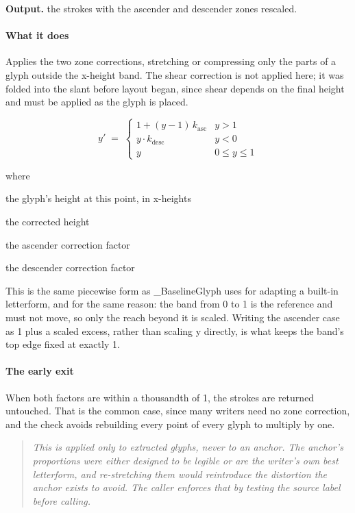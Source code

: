 \noindent\textbf{Output.} the strokes with the ascender and descender zones rescaled.


\paragraph{What it does}
Applies the two zone corrections, stretching or compressing only the parts of a glyph outside the x-height band. The shear correction is not applied here; it was folded into the slant before layout began, since shear depends on the final height and must be applied as the glyph is placed.


\begin{equation}
y' \;=\; \begin{cases} 1 + (y-1)\,k_{\mathrm{asc}} & y > 1 \\[3pt] y \cdot k_{\mathrm{desc}} & y < 0 \\[3pt] y & 0 \le y \le 1 \end{cases}
\end{equation}

\noindent where
\begin{description}[leftmargin=2.4em,style=nextline,font=\normalfont\ttfamily]\setlength\itemsep{1pt}
  \item[{$y$}] \normalfont the glyph's height at this point, in x-heights
  \item[{$y'$}] \normalfont the corrected height
  \item[{$k_{\mathrm{asc}}$}] \normalfont the ascender correction factor
  \item[{$k_{\mathrm{desc}}$}] \normalfont the descender correction factor
\end{description}
This is the same piecewise form as \_BaselineGlyph uses for adapting a built-in letterform, and for the same reason: the band from 0 to 1 is the reference and must not move, so only the reach beyond it is scaled. Writing the ascender case as 1 plus a scaled excess, rather than scaling y directly, is what keeps the band's top edge fixed at exactly 1.


\paragraph{The early exit}
When both factors are within a thousandth of 1, the strokes are returned untouched. That is the common case, since many writers need no zone correction, and the check avoids rebuilding every point of every glyph to multiply by one.


\begin{quote}\small\itshape This is applied only to extracted glyphs, never to an anchor. The anchor's proportions were either designed to be legible or are the writer's own best letterform, and re-stretching them would reintroduce the distortion the anchor exists to avoid. The caller enforces that by testing the source label before calling.\end{quote}

